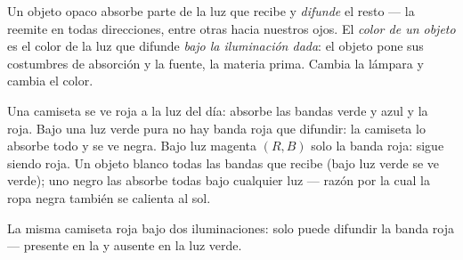 \begin{definition}\label{def:g11:color-light-sources:objectcolor}
Un objeto opaco absorbe parte de la luz que recibe y
\emph{difunde} el resto --- la reemite en todas
direcciones, entre otras hacia nuestros ojos. El \emph{color de un
objeto} es el color de la luz que difunde
\emph{bajo la iluminación dada}: el objeto pone sus costumbres de
absorción y la fuente, la materia prima. Cambia la lámpara y cambia el
color.
\end{definition}

\begin{example}\label{ex:g11:color-light-sources:redshirt}
Una camiseta se ve roja a la luz del día: absorbe las bandas verde y
azul y  la roja. Bajo una luz verde pura no hay banda roja que
difundir: la camiseta lo absorbe todo y se ve negra. Bajo luz magenta
$(R, B)$  solo la banda roja: sigue siendo roja. Un objeto blanco
 todas las bandas que recibe (bajo luz verde se ve verde); uno
negro las absorbe todas bajo cualquier luz --- razón por la cual la ropa
negra también se calienta al sol.
\end{example}

\begin{omfigure}
\qquad
{}

{\small La misma camiseta roja bajo dos iluminaciones: solo puede
difundir la banda roja --- presente en la  y ausente en la luz
verde.}
\end{omfigure}

